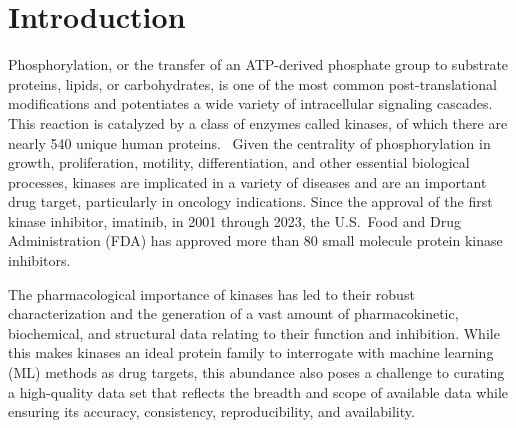 \documentclass[9pt,lessons]{livecoms}
\begin{document}


\section{Introduction}

Phosphorylation, or the transfer of an ATP-derived phosphate group to substrate proteins, lipids, or carbohydrates, is one of the most common post-translational modifications and potentiates a wide variety of intracellular signaling cascades.~\cite{Ayala-Aguilera2022, Ramazi2021} 
This reaction is catalyzed by a class of enzymes called kinases, of which there are nearly 540 unique human proteins.~\cite{Eid2017} 
Given the centrality of phosphorylation in growth, proliferation, motility, differentiation, and other essential biological processes, kinases are implicated in a variety of diseases and are an important drug target, particularly in oncology indications. 
Since the approval of the first kinase inhibitor, imatinib, in 2001 through 2023, the U.S.\ Food and Drug Administration (FDA) has approved more than 80 small molecule protein kinase inhibitors.~\cite{roskoski2023pki}


The pharmacological importance of kinases has led to their robust characterization and the generation of a vast amount of pharmacokinetic, biochemical, and structural data relating to their function and inhibition. 
While this makes kinases an ideal protein family to interrogate with machine learning (ML) methods as drug targets, this abundance also poses a challenge to curating a high-quality data set that reflects the breadth and scope of available data while ensuring its accuracy, consistency, reproducibility, and availability.
\end{document}
